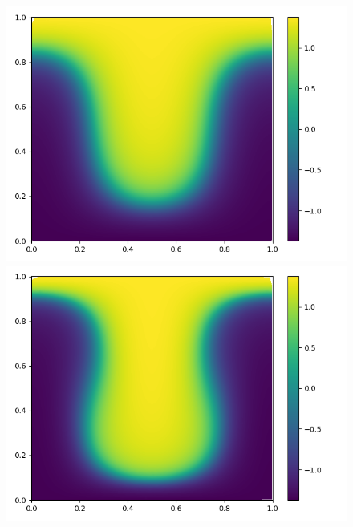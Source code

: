 \documentclass[a4paper, 14pt]{extarticle}
\begin{document}
		\begin{figure}[H]
			\begin{minipage}{0.5\textwidth}
				\centering
				\includegraphics[width = \linewidth]{3.png}
			\end{minipage}\hfill
			\begin{minipage}{0.5\textwidth}
				\centering
				\includegraphics[width = \linewidth]{4.png}
			\end{minipage}\hfill
		\end{figure}
	
\end{document}
